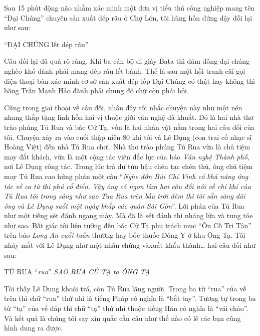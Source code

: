 \documentclass[../main.tex]{subfiles}
\begin{document}
\begin{multicols}{2}
Sau 15 phút động não nhằm xác minh một đơn vị tiểu thủ công nghiệp mang tên “Ðại Chúng” chuyên sản xuất dép râu ở Chợ Lớn, tôi hùng hồn đứng dậy đối lại như sau: 
\begin{blockquote}
        
“ÐẠI CHÚNG lết dép râu” 

\end{blockquote}
 
Câu đối lại đã quá rõ ràng. Khi ba cán bộ đi giày Bata thì đám đông đại chúng nghèo khổ đành phải mang dép râu lết bánh. Thế là sau một hồi tranh cãi gọi điện thoại bàn xác minh cơ sở sản xuất dép lốp Ðại Chúng có thật hay không thì băng Trần Mạnh Hảo đành phải chung độ chứ còn phải hỏi. 
 
Cũng trong giai thoại về câu đối, nhân đây tôi nhắc chuyện này như một nén nhang thắp tặng linh hồn hai vị thuộc giới văn nghệ đã khuất. Ðó là hai nhà thơ trào phúng Tú Rua và bác Cử Tạ, vốn là hai nhân vật nằm trong hai câu đối của tôi. Chuyện xảy ra vào cuối thập niên 80 khi tôi và Lê Dụng (con trai cố nhạc sĩ Hoàng Việt) đến nhà Tú Rua chơi. Nhà thơ trào phúng Tú Rua vừa là chủ tiệm may đắt khách, vừa là một cộng tác viên đắc lực của báo \textit{Văn nghệ Thành phố}, nơi Lê Dụng công tác. Trong lúc trà dư tửu hậu chén tạc chén thù, ông chủ tiệm may Tú Rua cao hứng phán một câu “\textit{Nghe đồn Bùi Chí Vinh có khả năng ứng tác về ca từ thi phú cổ điển.} \textit{Vậy ông có ngon làm hai câu đối nói về chí khí của Tú Rua tôi trong sáng như sao Tua Rua trên bầu trời đêm thì tôi sẵn sàng đãi ông và Lê Dụng suốt một ngày khắp các quán Sài Gòn}”. Lời phán của Tú Rua như một tiếng sét đánh ngang mày. Mà đã là sét đánh thì nháng lửa và tung tóe như sao. Bất giác tôi liên tưởng đến bác Cử Tạ phụ trách mục “Ôn Cố Tri Tân” trên báo \textit{Long An cuối tuần} thường hay bốc thuốc Ðông Y ở khu Ông Tạ. Tôi nháy mắt với Lê Dụng như một nhân chứng vàxuất khẩu thành… hai câu đối như sau: 
\begin{blockquote}
        
TÚ RUA “\textit{rua}” \textit{SAO RUA} 
\textit{CỬ TẠ tạ ÔNG TẠ} 

\end{blockquote}
 
Tôi thấy Lê Dụng khoái trá, còn Tú Rua lặng người. Trong ba từ “rua” của vế trên thì chữ “rua” thứ nhì là tiếng Pháp có nghĩa là “bắt tay”. Tương tự trong ba từ “tạ” của vế đáp thì chữ “tạ” thứ nhì thuộc tiếng Hán có nghĩa là “vái chào”. Và kết quả là chúng tôi say xỉn quắc cần câu như thế nào có lẽ các bạn cũng hình dung ra được. 
 

\end{multicols}
\end{document}
